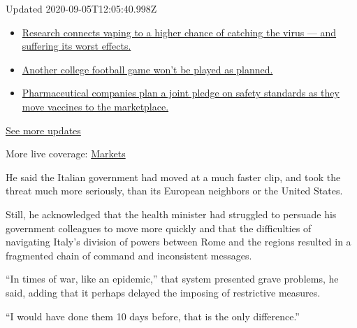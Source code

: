 Updated 2020-09-05T12:05:40.998Z

\begin{itemize}
\tightlist
\item
  \href{https://www.nytimes3xbfgragh.onion/2020/09/04/world/covid-19-coronavirus.html?action=click\&pgtype=Article\&state=default\&region=MAIN_CONTENT_1\&context=storylines_live_updates\#link-1654f6ad}{Research
  connects vaping to a higher chance of catching the virus --- and
  suffering its worst effects.}
\item
  \href{https://www.nytimes3xbfgragh.onion/2020/09/04/world/covid-19-coronavirus.html?action=click\&pgtype=Article\&state=default\&region=MAIN_CONTENT_1\&context=storylines_live_updates\#link-52e4198a}{Another
  college football game won't be played as planned.}
\item
  \href{https://www.nytimes3xbfgragh.onion/2020/09/04/world/covid-19-coronavirus.html?action=click\&pgtype=Article\&state=default\&region=MAIN_CONTENT_1\&context=storylines_live_updates\#link-181cef0}{Pharmaceutical
  companies plan a joint pledge on safety standards as they move
  vaccines to the marketplace.}
\end{itemize}

\href{https://www.nytimes3xbfgragh.onion/2020/09/04/world/covid-19-coronavirus.html?action=click\&pgtype=Article\&state=default\&region=MAIN_CONTENT_1\&context=storylines_live_updates}{See
more updates}

More live coverage:
\href{https://www.nytimes3xbfgragh.onion/live/2020/09/04/business/stock-market-today-coronavirus?action=click\&pgtype=Article\&state=default\&region=MAIN_CONTENT_1\&context=storylines_live_updates}{Markets}

He said the Italian government had moved at a much faster clip, and took
the threat much more seriously, than its European neighbors or the
United States.

Still, he acknowledged that the health minister had struggled to
persuade his government colleagues to move more quickly and that the
difficulties of navigating Italy's division of powers between Rome and
the regions resulted in a fragmented chain of command and inconsistent
messages.

``In times of war, like an epidemic,'' that system presented grave
problems, he said, adding that it perhaps delayed the imposing of
restrictive measures.

``I would have done them 10 days before, that is the only difference.''

